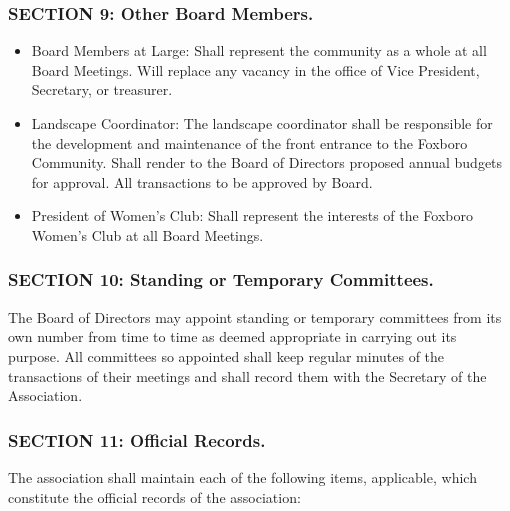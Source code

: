 \subsubsection{SECTION 9: Other Board Members.}

\begin{itemize}
\item Board Members at Large: Shall represent the community as a whole at all
Board Meetings. Will replace any vacancy in the office of Vice President,
Secretary, or treasurer.

\item Landscape Coordinator: The landscape coordinator shall be responsible
for the development and maintenance of the front entrance to the Foxboro
Community. Shall render to the Board of Directors proposed annual budgets
for approval. All transactions to be approved by Board.

\item President of Women’s Club: Shall represent the interests of the Foxboro
Women’s Club at all Board Meetings.
\end{itemize}

\subsubsection{SECTION 10: Standing or Temporary Committees.}
The Board of Directors may appoint standing or temporary committees from
its own number from time to time as deemed appropriate in carrying out
its purpose. All committees so appointed shall keep regular minutes
of the transactions of their meetings and shall record them with the
Secretary of the Association.

\subsubsection{SECTION 11: Official Records.}
The association shall maintain each of the following items, applicable,
which constitute the official records of the association:

